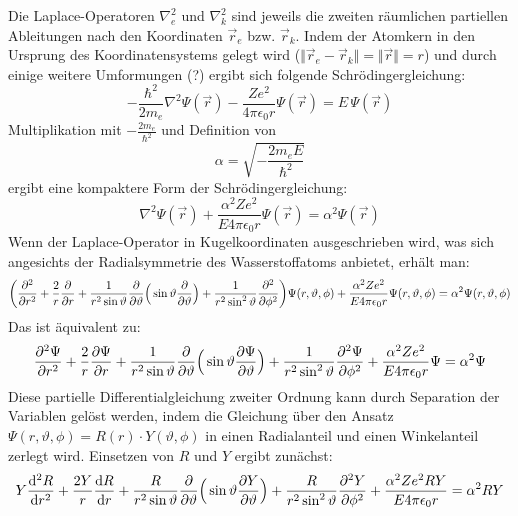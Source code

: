 \documentclass[9pt]{report}
\begin{document}
Die Laplace-Operatoren $\nabla^{2}_{e}$ und $\nabla^{2}_{k}$ sind jeweils die zweiten räumlichen partiellen Ableitungen nach den Koordinaten $\vec{r}_e$ bzw. $\vec{r}_k$. Indem der Atomkern in den Ursprung des Koordinatensystems gelegt wird ($\Vert\vec{r}_e-\vec{r}_k\Vert=\Vert\vec{r}\Vert=r$) und durch einige weitere Umformungen (?) ergibt sich folgende Schrödingergleichung:
\begin{equation}
-\frac{\hbar^2}{2m_e}\nabla^2\Psi(\vec{r})-\frac{Ze^2}{4\pi\epsilon_{0}r}\Psi(\vec{r})=E\,\Psi(\vec{r})
\end{equation}
Multiplikation mit $-\frac{2m_e}{\hbar^2}$ und Definition von
\begin{equation}
\alpha=\sqrt{-\frac{2m_{e}E}{\hbar^2}}
\end{equation}
ergibt eine kompaktere Form der Schrödingergleichung:
\begin{equation}
\nabla^2\Psi(\vec{r})+\frac{\alpha^2Ze^2}{E4\pi\epsilon_{0}r}\Psi(\vec{r})=\alpha^2\Psi(\vec{r})
\end{equation}
Wenn der Laplace-Operator in Kugelkoordinaten ausgeschrieben wird, was sich angesichts der Radialsymmetrie des Wasserstoffatoms anbietet, erhält man:
\begin{equation}
\bigg(\frac{\partial^2}{\partial r^2}+\frac{2}{r}\frac{\partial}{\partial r}+\frac{1}{r^2\sin\vartheta}\frac{\partial}{\partial\vartheta}\Big(\sin\vartheta\frac{\partial}{\partial\vartheta}\Big)+\frac{1}{r^{2}\sin^{2}\vartheta}\frac{\partial^2}{\partial\phi^2}\bigg)\Psi(r,\vartheta,\phi)+\frac{\alpha^2Ze^2}{E4\pi\epsilon_{0}r}\Psi(r,\vartheta,\phi)=\alpha^2\Psi(r,\vartheta,\phi)\notag
\end{equation}
Das ist äquivalent zu:
\begin{equation}
\frac{\partial^{2}\Psi}{\partial r^2}+\frac{2}{r}\frac{\partial\Psi}{\partial r}+\frac{1}{r^2\sin\vartheta}\frac{\partial}{\partial\vartheta}\Big(\sin\vartheta\frac{\partial\Psi}{\partial\vartheta}\Big)+\frac{1}{r^{2}\sin^{2}\vartheta}\frac{\partial^{2}\Psi}{\partial\phi^2}+\frac{\alpha^2Ze^2}{E4\pi\epsilon_{0}r}\Psi=\alpha^2\Psi\notag
\end{equation}
Diese partielle Differentialgleichung zweiter Ordnung kann durch Separation der Variablen gelöst werden, indem die Gleichung über den Ansatz $\Psi(r,\vartheta,\phi)=R(r)\cdot Y(\vartheta,\phi)$ in einen Radialanteil und einen Winkelanteil zerlegt wird. Einsetzen von $R$ und $Y$ ergibt zunächst:
\begin{equation}
Y\frac{\mathrm{d}^{2}R}{\mathrm{d} r^2}+\frac{2Y}{r}\frac{\mathrm{d}R}{\mathrm{d} r}+\frac{R}{r^2\sin\vartheta}\frac{\partial}{\partial\vartheta}\Big(\sin\vartheta\frac{\partial Y}{\partial\vartheta}\Big)+\frac{R}{r^{2}\sin^{2}\vartheta}\frac{\partial^{2}Y}{\partial\phi^2}+\frac{\alpha^2Ze^{2}RY}{E4\pi\epsilon_{0}r}=\alpha^{2}RY\notag
\end{equation}
\end{document}
